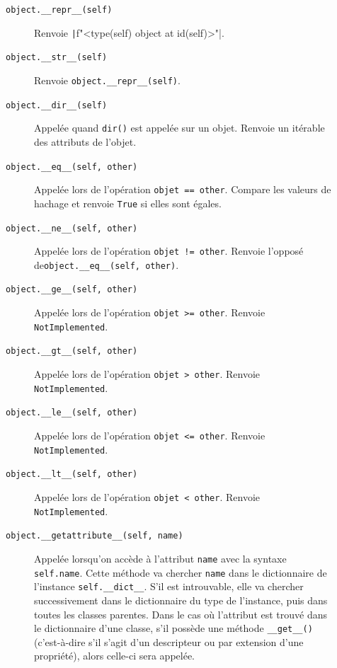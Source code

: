 \documentclass[a4paper, 10pt]{article}
\begin{document}
\begin{description}
\begin{description}
\begin{verbatim}
\end{verbatim}
\item[\texttt{object.__repr__(self)}] Renvoie \texttt|f"<{type(self)} object at {id(self)}>"|.
        \item[\texttt{object.__str__(self)}] Renvoie \texttt{object.__repr__(self)}. 
        \item[\texttt{object.__dir__(self)}] Appelée quand \texttt{dir()} est appelée sur un objet. Renvoie un itérable des attributs de l'objet.
        \item[\texttt{object.__eq__(self, other)}] Appelée lors de l'opération \texttt{objet == other}. Compare les valeurs de hachage et renvoie \texttt{True} si elles sont égales.
        \item[\texttt{object.__ne__(self, other)}] Appelée lors de l'opération \texttt{objet != other}. Renvoie l'opposé de\break\texttt{object.__eq__(self, other)}.
        \item[\texttt{object.__ge__(self, other)}] Appelée lors de l'opération \texttt{objet >= other}. Renvoie \texttt{NotImplemented}.
        \item[\texttt{object.__gt__(self, other)}] Appelée lors de l'opération \texttt{objet > other}. Renvoie \texttt{NotImplemented}.
        \item[\texttt{object.__le__(self, other)}] Appelée lors de l'opération \texttt{objet <= other}. Renvoie \texttt{NotImplemented}.
        \item[\texttt{object.__lt__(self, other)}] Appelée lors de l'opération \texttt{objet < other}. Renvoie \texttt{NotImplemented}.
        \item[\texttt{object.__getattribute__(self, name)}] Appelée lorsqu'on accède à l'attribut \texttt{name} avec la syntaxe \texttt{self.name}. Cette méthode va chercher \texttt{name} dans le dictionnaire de l'instance \texttt{self.__dict__}. S'il est introuvable, elle
        va chercher successivement dans le dictionnaire du type de l'instance, puis dans toutes les classes parentes. Dans le cas où l'attribut est trouvé dans le dictionnaire d'une classe, s'il possède une méthode \texttt{__get__()} (c'est-à-dire s'il s'agit d'un descripteur ou par extension d'une propriété), alors celle-ci sera appelée. 

\end{description}
\end{description}
\end{document}
